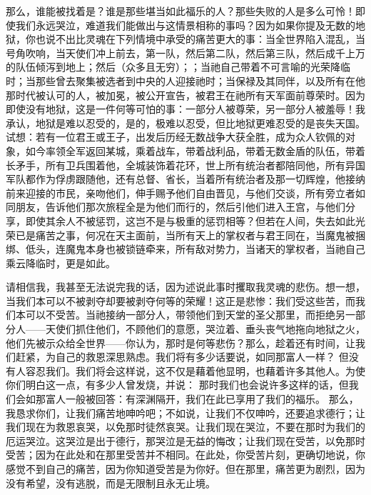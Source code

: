 那么，谁能被找着是？谁是那些堪当如此福乐的人？那些失败的人是多么可怜！即使我们永远哭泣，难道我们能做出与这情景相称的事吗？因为如果你提及无数的地狱，你也说不出比灵魂在下列情境中承受的痛苦更大的事：当全世界陷入混乱，当号角吹响，当天使们冲上前去，第一队，然后第二队，然后第三队，然后成千上万的队伍倾泻到地上；然后（众多且无穷）；；当祂自己带着不可言喻的光荣降临时；当那些曾去聚集被选者到中央的人迎接祂时；当保禄及其同伴，以及所有在他那时代被认可的人，被加冕，被公开宣告，被君王在祂所有天军面前尊荣时。因为即使没有地狱，这是一件何等可怕的事：一部分人被尊荣，另一部分人被羞辱！我承认，地狱是难以忍受的，是的，极难以忍受，但比地狱更难忍受的是丧失天国。试想：若有一位君王或王子，出发后历经无数战争大获全胜，成为众人钦佩的对象，如今率领全军返回某城，乘着战车，带着战利品，带着无数金盾的队伍，带着长矛手，所有卫兵围着他，全城装饰着花环，世上所有统治者都陪同他，所有异国军队都作为俘虏跟随他，还有总督、省长，当着所有统治者及那一切辉煌，他接纳前来迎接的市民，亲吻他们，伸手赐予他们自由晋见，与他们交谈，所有旁立者如同朋友，告诉他们那次旅程全是为他们而行的，然后引他们进入王宫，与他们分享，即使其余人不被惩罚，这岂不是与极重的惩罚相等？但若在人间，失去如此光荣已是痛苦之事，何况在天主面前，当所有天上的掌权者与君王同在，当魔鬼被捆绑、低头，连魔鬼本身也被锁链牵来，所有敌对势力，当诸天的掌权者，当祂自己乘云降临时，更是如此。\par

请相信我，我甚至无法说完我的话，因为述说此事时攫取我灵魂的悲伤。想一想，当我们本可以不被剥夺却要被剥夺何等的荣耀！这正是悲惨：我们受这些苦，而我们本可以不受苦。当祂接纳一部分人，带领他们到天堂的圣父那里，而拒绝另一部分人——天使们抓住他们，不顾他们的意愿，哭泣着、垂头丧气地拖向地狱之火，他们先被示众给全世界——你认为，那时是何等悲伤？那么，趁着还有时间，让我们赶紧，为自己的救恩深思熟虑。我们将有多少话要说，如同那富人一样？ 但没有人容忍我们。我们将会这样说，这不仅是藉着他显明，也藉着许多其他人。为使你们明白这一点，有多少人曾发烧，并说： 那时我们也会说许多这样的话，但我们会如那富人一般被回答：有深渊隔开，我们在此已享用了我们的福乐。 那么，我恳求你们，让我们痛苦地呻吟吧；不如说，让我们不仅呻吟，还要追求德行；让我们现在为救恩哀哭，以免那时徒然哀哭。让我们现在哭泣，不要在那时为我们的厄运哭泣。这哭泣是出于德行，那哭泣是无益的悔改；让我们现在受苦，以免那时受苦；因为在此处和在那里受苦并不相同。在此处，你受苦片刻，更确切地说，你感觉不到自己的痛苦，因为你知道受苦是为你好。但在那里，痛苦更为剧烈，因为没有希望，没有逃脱，而是无限制且永无止境。\par

